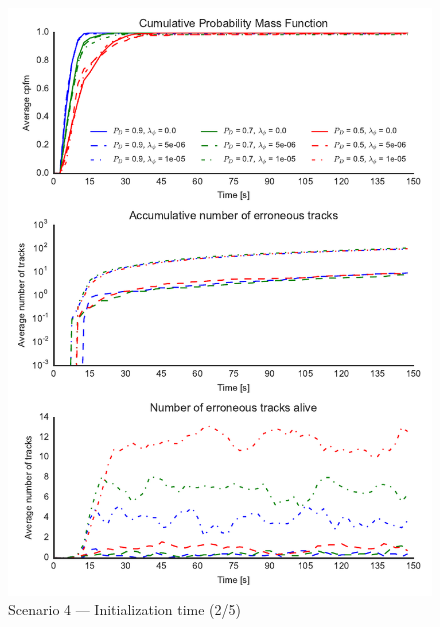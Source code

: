 \begin{figure}
\centering
\includegraphics{Figures/plots/Scenario4_Init-Time(2-5).pdf}
\caption{Scenario 4 --- Initialization time (2/5)}\label{fig:init4_time_2-5}
\end{figure}

